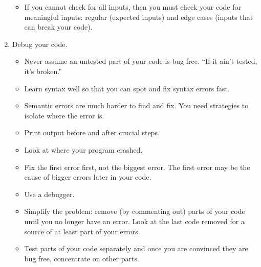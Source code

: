 \documentclass[letterpaper,10pt,english]{sphinxmanual}
\begin{document}
\begin{enumerate}
\begin{itemize}
\item {} 
If you cannot check for all inputs, then you must check your code
for meaningful inputs: regular (expected inputs) and edge cases (inputs
that can break your code).

\end{itemize}

\item {} 
Debug your code.
\begin{itemize}
\item {} 
Never assume an untested part of your code is bug free. “If it ain’t tested, it’s broken.”

\item {} 
Learn syntax well so that you can spot and fix syntax errors
fast.

\item {} 
Semantic errors are much harder to find and fix. You need
strategies to isolate where the error is.

\item {} 
Print output before and after crucial steps.

\item {} 
Look at where your program crashed.

\item {} 
Fix the first error first, not the biggest error. The first
error may be the cause of bigger errors later in your code.

\item {} 
Use a debugger.

\item {} 
Simplify the problem: remove (by commenting out) parts of your
code until you no longer have an error. Look at the last code
removed for a source of at least part of your errors.

\item {} 
Test parts of your code separately and once you are convinced
they are bug free, concentrate on other parts.

\end{itemize}

\end{enumerate}
\end{document}
